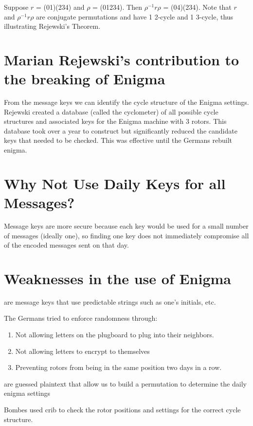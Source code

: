 \begin{example} Suppose $r$ = (01)(234) and $\rho$ = (01234). Then $\rho^{-1} r \rho$ = (04)(234). Note that $r$ and $\rho^{-1} r \rho$ are conjugate permutations and have 1 2-cycle and 1 3-cycle, thus illustrating Rejewski's Theorem.


\section{Marian Rejewski's contribution to the breaking of Enigma}

From the message keys we can identify the cycle structure of the Enigma settings. Rejewski created a database (called the cyclometer) of all possible cycle structures and associated keys for the Enigma machine with 3 rotors. This database took over a year to construct but significantly reduced the candidate keys that needed to be checked. This was effective until the Germans rebuilt enigma.

\section{Why Not Use Daily Keys for all Messages?}
Message keys are more secure because each key would be used for a small number of messages (ideally one), so finding one key does not immediately compromise all of the encoded messages sent on that day.

\section{Weaknesses in the use of Enigma}
\begin{definition}
 are message keys that use predictable strings such as one's initials, etc.
\end{definition}

The Germans tried to enforce randomness through:
\begin{enumerate}
\item Not allowing letters on the plugboard to plug into their neighbors.
\item Not allowing letters to encrypt to themselves
\item Preventing rotors from being in the same position two days in a row.
\end{enumerate}

\begin{definition}
 are guessed plaintext that allow us to build a permutation to determine the daily enigma settings  
\end{definition}
Bombes used crib to check the rotor positions and settings for the correct cycle structure.



\end{example}
